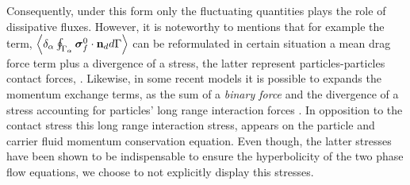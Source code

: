 Consequently, under this form only the fluctuating quantities plays the role of dissipative fluxes. 
However, it is noteworthy to mentions that for example the term, $ \left<\delta_\alpha \oint_{\Gamma_{\alpha}} {\bm{\sigma}_f^0 \cdot \textbf{n}_d} d\Gamma\right>$ can be reformulated in certain situation a mean drag force term plus a divergence of a stress, the latter represent particles-particles contact forces, \citet{jackson1997locally,zhang1997momentum,nott2011suspension,zhang2021ensemble}. 
Likewise, in some recent models it is possible to expands the momentum exchange terms, as the sum of a \textit{binary force} and the divergence of a stress accounting for particles' long range interaction forces \citep{zhang2021ensemble,nott2011suspension}. 
In opposition to the contact stress this long range interaction stress, appears on the particle and carrier fluid momentum conservation equation. 
Even though, the latter stresses have been shown to be indispensable to ensure the hyperbolicity of the two phase flow equations\citep{fox2020hyperbolic}, we choose to not explicitly display this stresses. 


